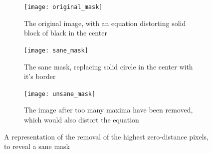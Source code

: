 \documentclass[../main.tex]{subfiles}
\begin{document}
    \begin{figure}[H]
      \centering
      \begin{subfigure}[B]{0.9\textwidth}
        \centering
        \texttt{[image: original\_mask]}
        \caption{The original image, with an equation distorting solid block of black in the center}
      \end{subfigure}

      \begin{subfigure}[B]{0.9\textwidth}
        \centering
        \texttt{[image: sane\_mask]}
        \caption{The sane mask, replacing solid circle in the center with it's border}
      \end{subfigure}

      \begin{subfigure}[B]{0.9\textwidth}
        \centering
        \texttt{[image: unsane\_mask]}
        \caption{The image after too many maxima have been removed, which would also distort the equation}
      \end{subfigure}
      \caption[
        Maximum zero-distance reduction to produce sane mask
      ]{A representation of the removal of the highest zero-distance pixels, to reveal a sane mask}
      \label{sanemasking}
    \end{figure}
\end{document}
